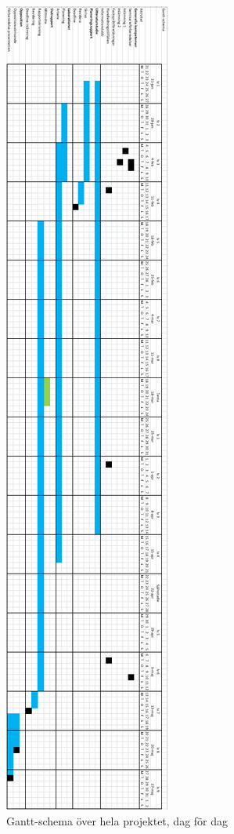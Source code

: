 \newpage
\thispagestyle{empty}
\begin{figure}[H]
    \centering
    \includegraphics[scale=0.6]{Ganttroterad.PNG}
    \caption{Gantt-schema över hela projektet, dag för dag}
    \label{fig:Ganttroterad}
\end{figure}
